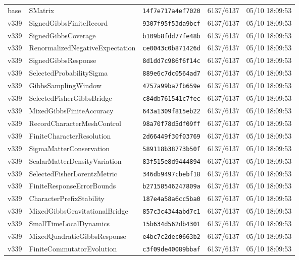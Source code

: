 \documentclass[11pt]{article}
\theoremstyle{definition}\newtheorem{deriv}{Derivação}
\begin{document}
{\begin{longtable}{@{}lllll@{}}
base & SMatrix & \texttt{14f7e717a4ef7020} & 6137/6137 & 05/10 18:09:53 \\
v339 & SignedGibbsFiniteRecord & \texttt{9307f95f53da9bcf} & 6137/6137 & 05/10 18:09:53 \\
v339 & SignedGibbsCoverage & \texttt{b109b8fdd77fe48b} & 6137/6137 & 05/10 18:09:53 \\
v339 & RenormalizedNegativeExpectation & \texttt{ce0043c0b871426d} & 6137/6137 & 05/10 18:09:53 \\
v339 & SignedGibbsResponse & \texttt{8d1dd7c986f6f14c} & 6137/6137 & 05/10 18:09:53 \\
v339 & SelectedProbabilitySigma & \texttt{889e6c7dc0564ad7} & 6137/6137 & 05/10 18:09:53 \\
v339 & GibbsSamplingWindow & \texttt{4757a99ba7fb659e} & 6137/6137 & 05/10 18:09:53 \\
v339 & SelectedFisherGibbsBridge & \texttt{c84db761541c7fec} & 6137/6137 & 05/10 18:09:53 \\
v339 & MixedGibbsFiniteAccuracy & \texttt{643a1309f815eb22} & 6137/6137 & 05/10 18:09:53 \\
v339 & RecordCharacterMeshControl & \texttt{98a70f78d5df09ff} & 6137/6137 & 05/10 18:09:53 \\
v339 & FiniteCharacterResolution & \texttt{2d66449f30f03769} & 6137/6137 & 05/10 18:09:53 \\
v339 & SigmaMatterConservation & \texttt{589118b38773b50f} & 6137/6137 & 05/10 18:09:53 \\
v339 & ScalarMatterDensityVariation & \texttt{83f515e8d9444894} & 6137/6137 & 05/10 18:09:53 \\
v339 & SelectedFisherLorentzMetric & \texttt{346db9497cbebf18} & 6137/6137 & 05/10 18:09:53 \\
v339 & FiniteResponseErrorBounds & \texttt{b27158546247809a} & 6137/6137 & 05/10 18:09:53 \\
v339 & CharacterPrefixStability & \texttt{187e4a58a6cc5ba0} & 6137/6137 & 05/10 18:09:53 \\
v339 & MixedGibbsGravitationalBridge & \texttt{857c3c4344abd7c1} & 6137/6137 & 05/10 18:09:53 \\
v339 & SmallTimeLocalDynamics & \texttt{15b634d562db4301} & 6137/6137 & 05/10 18:09:53 \\
v339 & MixedQuadraticGibbsResponse & \texttt{e4bc7c2dec0663b2} & 6137/6137 & 05/10 18:09:53 \\
v339 & FiniteCommutatorEvolution & \texttt{c3f09de40089bbaf} & 6137/6137 & 05/10 18:09:53 \\

\end{longtable}}
\end{document}
